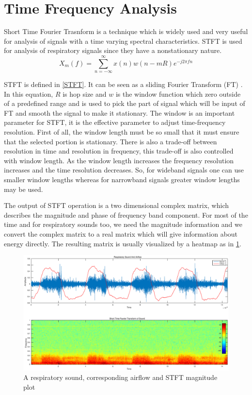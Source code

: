 \section{Time Frequency Analysis}
Short Time Fourier Trasnform is a technique which is widely used and very useful for analysis of signals with a time varying spectral characteristics. STFT is used for analysis of respiratory signals since they have a nonstationary nature. 
\begin{equation}
X_m(f) = \sum_{n=-\infty}^{\infty}x(n)w(n-mR)e^{-j2\pi fn}
\label{STFT}
\end{equation} \par
STFT is defined in \eqref{STFT}. It can be seen as a sliding Fourier Transform (FT) \cite{stft-first}. In this equation, $R$ is hop size and $w$ is the window function which zero outside of a predefined range and is used to pick the part of signal which will be input of FT and smooth the signal to make it stationary. The window is an important parameter for STFT, it is the effective parameter to adjust time-frequency resolution. First of all, the window length must be so small that it must ensure that the selected portion is stationary. There is also a trade-off between resolution in time and resolution in frequency, this trade-off is also controlled with window length. As the  window length increases the frequency resolution increases and the time resolution decreases. So, for wideband signals one can use smaller window lengths whereas for narrowband signals greater window lengths may be used. \par
The output of STFT operation is a two dimensional complex matrix, which describes the magnitude and phase of frequency band component. For most of the time and for respiratory sounds too, we need the magnitude information and we convert the complex matrix to a real matrix which will give information about energy directly. The resulting matrix is usually visualized by a heatmap as in \ref{fig:sound_flow_specgram}.
\begin{figure}
	\begin{center}
		\includegraphics[width=\textwidth]{figures/sound_flow_specgram.eps}
		\caption{A respiratory sound, corresponding airflow and STFT magnitude plot}
		\label{fig:sound_flow_specgram}
	\end{center}
\end{figure} \par
